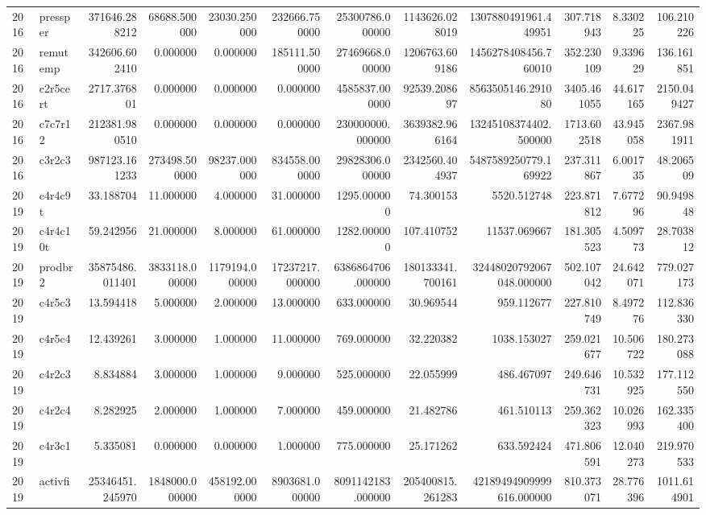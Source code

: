 \begin{tabular}{llrrrrrrrrrr}
2016 & pressper & 371646.288212 & 68688.500000 & 23030.250000 & 232666.750000 & 25300786.000000 & 1143626.028019 & 1307880491961.449951 & 307.718943 & 8.330225 & 106.210226 \\
2016 & remutemp & 342606.602410 & 0.000000 & 0.000000 & 185111.500000 & 27469668.000000 & 1206763.609186 & 1456278408456.760010 & 352.230109 & 9.339629 & 136.161851 \\
2016 & c2r5cert & 2717.376801 & 0.000000 & 0.000000 & 0.000000 & 4585837.000000 & 92539.208697 & 8563505146.291080 & 3405.461055 & 44.617165 & 2150.049427 \\
2016 & c7c7r12 & 212381.980510 & 0.000000 & 0.000000 & 0.000000 & 230000000.000000 & 3639382.966164 & 13245108374402.500000 & 1713.602518 & 43.945058 & 2367.981911 \\
2016 & c3r2c3 & 987123.161233 & 273498.500000 & 98237.000000 & 834558.000000 & 29828306.000000 & 2342560.404937 & 5487589250779.169922 & 237.311867 & 6.001735 & 48.206509 \\
2019 & c4r4c9t & 33.188704 & 11.000000 & 4.000000 & 31.000000 & 1295.000000 & 74.300153 & 5520.512748 & 223.871812 & 7.677296 & 90.949848 \\
2019 & c4r4c10t & 59.242956 & 21.000000 & 8.000000 & 61.000000 & 1282.000000 & 107.410752 & 11537.069667 & 181.305523 & 4.509773 & 28.703812 \\
2019 & prodbr2 & 35875486.011401 & 3833118.000000 & 1179194.000000 & 17237217.000000 & 6386864706.000000 & 180133341.700161 & 32448020792067048.000000 & 502.107042 & 24.642071 & 779.027173 \\
2019 & c4r5c3 & 13.594418 & 5.000000 & 2.000000 & 13.000000 & 633.000000 & 30.969544 & 959.112677 & 227.810749 & 8.497276 & 112.836330 \\
2019 & c4r5c4 & 12.439261 & 3.000000 & 1.000000 & 11.000000 & 769.000000 & 32.220382 & 1038.153027 & 259.021677 & 10.506722 & 180.273088 \\
2019 & c4r2c3 & 8.834884 & 3.000000 & 1.000000 & 9.000000 & 525.000000 & 22.055999 & 486.467097 & 249.646731 & 10.532925 & 177.112550 \\
2019 & c4r2c4 & 8.282925 & 2.000000 & 1.000000 & 7.000000 & 459.000000 & 21.482786 & 461.510113 & 259.362323 & 10.026993 & 162.335400 \\
2019 & c4r3c1 & 5.335081 & 0.000000 & 0.000000 & 1.000000 & 775.000000 & 25.171262 & 633.592424 & 471.806591 & 12.040273 & 219.970533 \\
2019 & activfi & 25346451.245970 & 1848000.000000 & 458192.000000 & 8903681.000000 & 8091142183.000000 & 205400815.261283 & 42189494909999616.000000 & 810.373071 & 28.776396 & 1011.614901 \\

\end{tabular}
